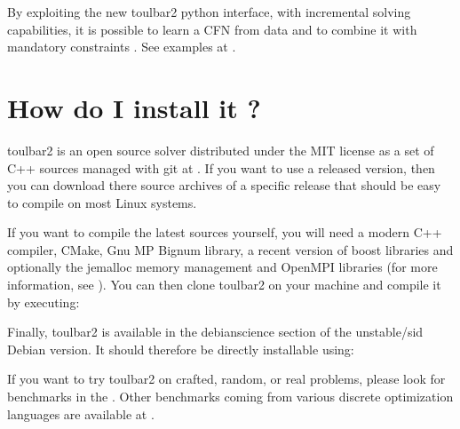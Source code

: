 \documentclass[letterpaper,10pt,openany,oneside,english]{sphinxmanual}
\begin{document}
\sphinxAtStartPar
By exploiting the new toulbar2 python interface, with incremental solving capabilities, it is possible to learn a CFN from data and to combine it with mandatory constraints .
See examples at .


\section{How do I install it ?}
\label{\detokenize{userdoc:how-do-i-install-it}}
\sphinxAtStartPar
toulbar2 is an open source solver distributed under the MIT license as a set of C++ sources managed with git at . If you want
to use a released version, then you can download there source archives of a specific release that should be easy to compile on most Linux systems.

\sphinxAtStartPar
If you want to compile the latest sources yourself, you will need a modern C++ compiler, CMake, Gnu MP Bignum library, a recent version of boost libraries and optionally the jemalloc memory management and OpenMPI libraries (for more information, see {\hyperref[\detokenize{_files/README:readme-5}]{}}). You can then clone toulbar2 on your machine and compile it by executing:

\begin{sphinxVerbatim}[commandchars=\\\{\}]
  
 
 
 
 
\end{sphinxVerbatim}

\sphinxAtStartPar
Finally, toulbar2 is available in the debian\sphinxhyphen{}science section of the unstable/sid Debian version. It should therefore be directly installable using:

\begin{sphinxVerbatim}[commandchars=\\\{\}]
   
\end{sphinxVerbatim}

\sphinxAtStartPar
If you want to try toulbar2 on crafted, random, or real problems, please look for benchmarks in the . Other benchmarks coming from various discrete optimization languages are available at  .
\end{document}
